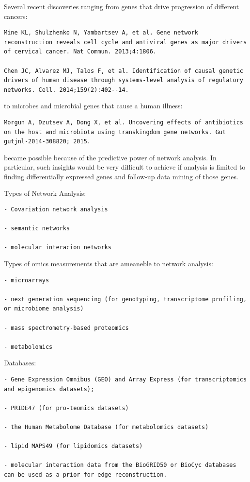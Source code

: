 \documentclass[
]{book}
\begin{document}
Several recent discoveries ranging from genes that drive progression of different cancers:

\begin{verbatim}
Mine KL, Shulzhenko N, Yambartsev A, et al. Gene network reconstruction reveals cell cycle and antiviral genes as major drivers of cervical cancer. Nat Commun. 2013;4:1806.

Chen JC, Alvarez MJ, Talos F, et al. Identification of causal genetic drivers of human disease through systems-level analysis of regulatory networks. Cell. 2014;159(2):402--14.
\end{verbatim}

to microbes and microbial genes that cause a human illness:

\begin{verbatim}
Morgun A, Dzutsev A, Dong X, et al. Uncovering effects of antibiotics on the host and microbiota using transkingdom gene networks. Gut gutjnl-2014-308820; 2015.
\end{verbatim}

became possible because of the predictive power of network analysis. In particular, such insights would be very difficult to achieve if analysis is limited to finding differentially expressed genes and follow-up data mining of those genes.

Types of Network Analysis:

\begin{verbatim}
- Covariation network analysis

- semantic networks

- molecular interacion networks
\end{verbatim}

Types of omics measurements that are ameaneble to network analysis:

\begin{verbatim}
- microarrays

- next generation sequencing (for genotyping, transcriptome profiling, or microbiome analysis)

- mass spectrometry-based proteomics

- metabolomics
\end{verbatim}

Databases:

\begin{verbatim}
- Gene Expression Omnibus (GEO) and Array Express (for transcriptomics and epigenomics datasets);

- PRIDE47 (for pro-teomics datasets)

- the Human Metabolome Database (for metabolomics datasets)

- lipid MAPS49 (for lipidomics datasets)

- molecular interaction data from the BioGRID50 or BioCyc databases can be used as a prior for edge reconstruction.
\end{verbatim}
\end{document}
